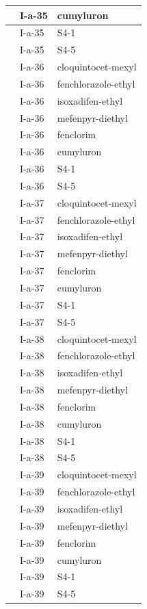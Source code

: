 \documentclass[11pt,a4paper]{article}
\begin{document}
\begin{table}[h]
\begin{tabular}{|l|l|l|}
 & I-a-35 & cumyluron \\ \hline
 & I-a-35 & S4-1 \\ \hline
 & I-a-35 & S4-5 \\ \hline
 & I-a-36 & cloquintocet-mexyl \\ \hline
 & I-a-36 & fenchlorazole-ethyl \\ \hline
 & I-a-36 & isoxadifen-ethyl \\ \hline
 & I-a-36 & mefenpyr-diethyl \\ \hline
 & I-a-36 & fenclorim \\ \hline
 & I-a-36 & cumyluron \\ \hline
 & I-a-36 & S4-1 \\ \hline
 & I-a-36 & S4-5 \\ \hline
 & I-a-37 & cloquintocet-mexyl \\ \hline
 & I-a-37 & fenchlorazole-ethyl \\ \hline
 & I-a-37 & isoxadifen-ethyl \\ \hline
 & I-a-37 & mefenpyr-diethyl \\ \hline
 & I-a-37 & fenclorim \\ \hline
 & I-a-37 & cumyluron \\ \hline
 & I-a-37 & S4-1 \\ \hline
 & I-a-37 & S4-5 \\ \hline
 & I-a-38 & cloquintocet-mexyl \\ \hline
 & I-a-38 & fenchlorazole-ethyl \\ \hline
 & I-a-38 & isoxadifen-ethyl \\ \hline
 & I-a-38 & mefenpyr-diethyl \\ \hline
 & I-a-38 & fenclorim \\ \hline
 & I-a-38 & cumyluron \\ \hline
 & I-a-38 & S4-1 \\ \hline
 & I-a-38 & S4-5 \\ \hline
 & I-a-39 & cloquintocet-mexyl \\ \hline
 & I-a-39 & fenchlorazole-ethyl \\ \hline
 & I-a-39 & isoxadifen-ethyl \\ \hline
 & I-a-39 & mefenpyr-diethyl \\ \hline
 & I-a-39 & fenclorim \\ \hline
 & I-a-39 & cumyluron \\ \hline
 & I-a-39 & S4-1 \\ \hline
 & I-a-39 & S4-5 \\ \hline

\end{tabular}
\end{table}
\end{document}
